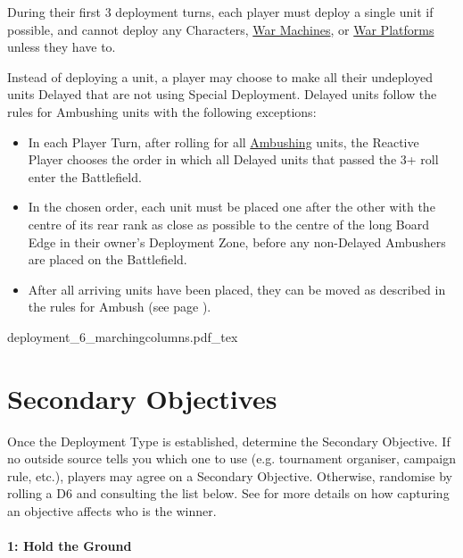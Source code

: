 During their first 3 deployment turns, each player must deploy a single unit if possible, and cannot deploy any Characters, \hyperref[war_machine]{War Machines}, or \hyperref[war_platform]{War Platforms} unless they have to.

Instead of deploying a unit, a player may choose to make all their undeployed units Delayed that are not using Special Deployment. Delayed units follow the rules for Ambushing units with the following exceptions:
\begin{itemize}
\item In each Player Turn, after rolling for all \hyperref[ambush]{Ambushing} units, the Reactive Player chooses the order in which all Delayed units that passed the 3+ roll enter the Battlefield.
\item In the chosen order, each unit must be placed one after the other with the centre of its rear rank as close as possible to the centre of the long Board Edge in their owner's Deployment Zone, before any non-Delayed Ambushers are placed on the Battlefield.
\item After all arriving units have been placed, they can be moved as described in the rules for Ambush (see page \pageref{ambush}).
\end{itemize}

\begin{center}
	\def\MarchColfontsize{\fontsize{7}{8.4}\selectfont}
	\def\svgwidth{0.36\textwidth}
	{deployment_6_marchingcolumns.pdf_tex}
\end{center}

\columnbreak

\section{Secondary Objectives}
\label{secondary_objectives}

Once the Deployment Type is established, determine the Secondary Objective. If no outside source tells you which one to use (e.g. tournament organiser, campaign rule, etc.), players may agree on a Secondary Objective. Otherwise, randomise by rolling a D6 and consulting the list below. See  for more details on how capturing an objective affects who is the winner.

\paragraph{1: Hold the Ground}


